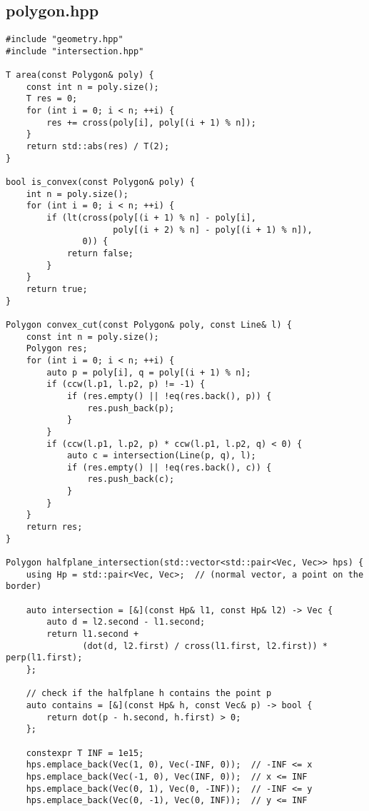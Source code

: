 \subsection{polygon.hpp}

\begin{small}
\begin{markdown}

\end{markdown}
\end{small}

\begin{lstlisting}
#include "geometry.hpp"
#include "intersection.hpp"

T area(const Polygon& poly) {
    const int n = poly.size();
    T res = 0;
    for (int i = 0; i < n; ++i) {
        res += cross(poly[i], poly[(i + 1) % n]);
    }
    return std::abs(res) / T(2);
}

bool is_convex(const Polygon& poly) {
    int n = poly.size();
    for (int i = 0; i < n; ++i) {
        if (lt(cross(poly[(i + 1) % n] - poly[i],
                     poly[(i + 2) % n] - poly[(i + 1) % n]),
               0)) {
            return false;
        }
    }
    return true;
}

Polygon convex_cut(const Polygon& poly, const Line& l) {
    const int n = poly.size();
    Polygon res;
    for (int i = 0; i < n; ++i) {
        auto p = poly[i], q = poly[(i + 1) % n];
        if (ccw(l.p1, l.p2, p) != -1) {
            if (res.empty() || !eq(res.back(), p)) {
                res.push_back(p);
            }
        }
        if (ccw(l.p1, l.p2, p) * ccw(l.p1, l.p2, q) < 0) {
            auto c = intersection(Line(p, q), l);
            if (res.empty() || !eq(res.back(), c)) {
                res.push_back(c);
            }
        }
    }
    return res;
}

Polygon halfplane_intersection(std::vector<std::pair<Vec, Vec>> hps) {
    using Hp = std::pair<Vec, Vec>;  // (normal vector, a point on the border)

    auto intersection = [&](const Hp& l1, const Hp& l2) -> Vec {
        auto d = l2.second - l1.second;
        return l1.second +
               (dot(d, l2.first) / cross(l1.first, l2.first)) * perp(l1.first);
    };

    // check if the halfplane h contains the point p
    auto contains = [&](const Hp& h, const Vec& p) -> bool {
        return dot(p - h.second, h.first) > 0;
    };

    constexpr T INF = 1e15;
    hps.emplace_back(Vec(1, 0), Vec(-INF, 0));  // -INF <= x
    hps.emplace_back(Vec(-1, 0), Vec(INF, 0));  // x <= INF
    hps.emplace_back(Vec(0, 1), Vec(0, -INF));  // -INF <= y
    hps.emplace_back(Vec(0, -1), Vec(0, INF));  // y <= INF


\end{lstlisting}

